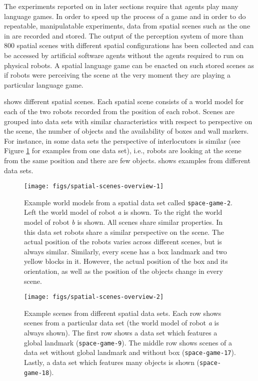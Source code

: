 The experiments reported on in later sections require that agents play many
language games. In order to speed up the process of a game and in order to
do repeatable, manipulatable experiments, data from spatial scenes  such as the one 
in  are recorded and stored. The output of the perception
system of more than 800 spatial scenes with different spatial configurations 
has been collected and can be accessed by artificial software agents without 
the agents required to run on physical robots.
A spatial language game can be enacted on such stored scenes as if robots 
were perceiving the scene at the very moment they are playing a particular 
language game.

 shows different spatial scenes. Each spatial scene 
consists of a world model for each of the two robots recorded from the position of 
each robot. Scenes are grouped into data sets with similar characteristics
with respect to perspective on the scene, the number of objects and
the availability of boxes and wall markers. For instance, in some data sets the perspective of interlocutors is similar (see Figure \ref{f:spatial-scenes-1} for 
examples from one data set), i.e., robots
are looking at the scene from the same position and there are few objects.
 shows examples from different data sets.

\begin{figure}
\begin{center}
\texttt{[image: figs/spatial-scenes-overview-1]}
\end{center}
\caption[Example world models]{Example world models from a spatial data
set called {\tt\footnotesize space-game-2}. Left the world model of 
robot \emph{a} is shown. To the right the world model of robot 
\emph{b} is shown. All scenes share similar properties. In 
this data set robots share a similar perspective on the scene.
The actual position of the robots varies across different scenes, but is always similar.
Similarly, every scene has a box landmark and two yellow blocks in it. 
However, the actual position of the box and its orientation, as well as the
position of the objects change in every scene.}
\label{f:spatial-scenes-1}
\end{figure}

\begin{figure}
\begin{center}
\texttt{[image: figs/spatial-scenes-overview-2]}
\end{center}
\caption[Example scenes]{Example scenes from different 
spatial data sets. Each row shows 
scenes from a particular data set (the world model of 
robot \emph{a} is always shown). 
The first row shows a data set which features a global landmark 
({\tt\footnotesize space-game-9}).
The middle row shows scenes of a data set without global landmark and
without box ({\tt\footnotesize space-game-17}). Lastly, a data set which features 
many objects is shown ({\tt\footnotesize space-game-18}).}
\label{f:spatial-scenes-2}
\end{figure}

